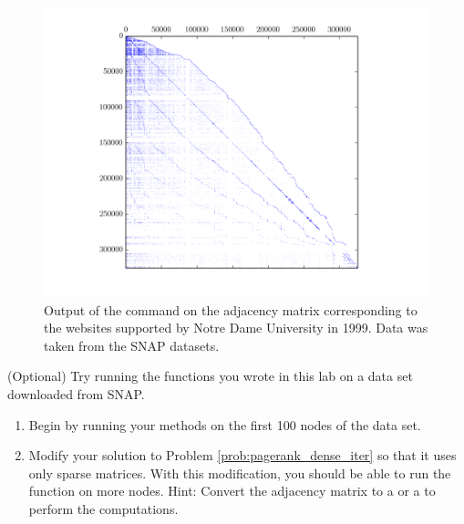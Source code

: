\begin{figure}
\centering
\includegraphics[width=\textwidth]{sparse_web.png}
\caption{Output of the  command on the adjacency matrix corresponding to the websites supported by Notre Dame University in 1999.
Data was taken from the SNAP datasets.}
\label{fig:WebSparse}
\end{figure}

\begin{problem}
(Optional) Try running the functions you wrote in this lab on a data set downloaded from SNAP.
\begin{enumerate}
\item Begin by running your methods on the first 100 nodes of the data set.
\item Modify your solution to Problem \ref{prob:pagerank_dense_iter} so that it uses only sparse matrices. 
With this modification, you should be able to run the function on more nodes.
Hint: Convert the adjacency matrix to a  or a  to perform the computations.
\end{enumerate}
\end{problem}
